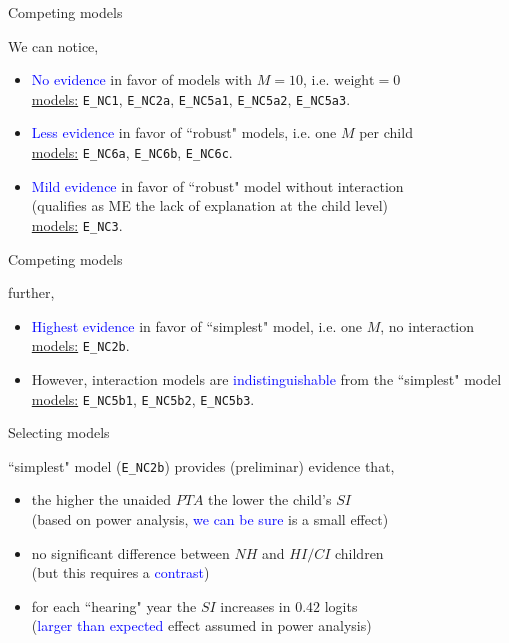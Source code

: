 %
%
\begin{lhframe}[rhgraphic={\texttt{[image: models\_table.png]}}]
	{Competing models}
	
	We can notice,
	\begin{itemize}
		\item \textcolor{blue}{No evidence} in favor of models with $M=10$, i.e. $\text{weight}=0$ \\
		\underline{models:} \texttt{E\_NC1}, \texttt{E\_NC2a}, \texttt{E\_NC5a1}, \texttt{E\_NC5a2}, \texttt{E\_NC5a3}. 
		\item \textcolor{blue}{Less evidence} in favor of ``robust" models, i.e. one $M$ per child \\
		\underline{models:} \texttt{E\_NC6a}, \texttt{E\_NC6b}, \texttt{E\_NC6c}. 
		\item \textcolor{blue}{Mild evidence} in favor of ``robust" model without interaction \\
		(qualifies as ME the lack of explanation at the child level) \\
		\underline{models:} \texttt{E\_NC3}. 
	\end{itemize}
\end{lhframe}
%
%
\begin{lhframe}[rhgraphic={\texttt{[image: models\_table.png]}}]
	{Competing models}
	
	further,
	\begin{itemize}
		\item \textcolor{blue}{Highest evidence} in favor of ``simplest" model, i.e. one $M$, no interaction \\ 
		\underline{models:} \texttt{E\_NC2b}.
		\item However, interaction models are \textcolor{blue}{indistinguishable} from the ``simplest" model \\
		\underline{models:} \texttt{E\_NC5b1}, \texttt{E\_NC5b2}, \texttt{E\_NC5b3}.
	\end{itemize}
\end{lhframe}
%
%
\begin{lhframe}[rhgraphic={\texttt{[image: select\_model1.png]}}]
	{Selecting models}
	
	``simplest" model (\texttt{E\_NC2b}) provides (preliminar) evidence that,
	\begin{itemize}
		\item the higher the unaided $PTA$ the lower the child's $SI$ \\
		{\small (based on power analysis, \textcolor{blue}{we can be sure} is a small effect) }
		\item no significant difference between $NH$ and $HI/CI$ children \\
		{\small (but this requires a \textcolor{blue}{contrast}) }
		\item for each ``hearing" year the $SI$ increases in $0.42$ logits \\
		{\small (\textcolor{blue}{larger than expected} effect assumed in power analysis) }
	\end{itemize}
\end{lhframe}
